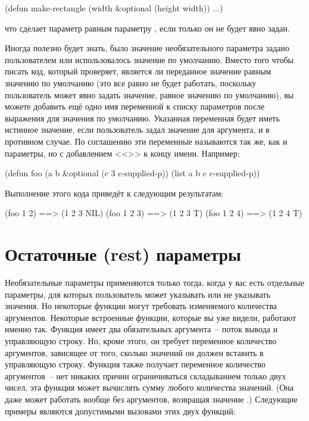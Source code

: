 \begin{myverb}
  (defun make-rectangle (width &optional (height width)) 
    ...)
\end{myverb}

\noindent{}что сделает параметр  равным параметру , если только он не будет
явно задан.

Иногда полезно будет знать, было значение необязательного параметра задано
пользователем или использовалось значение по умолчанию.  Вместо того чтобы писать код,
который проверяет, является ли переданное значение равным значению по умолчанию (это все
равно не будет работать, поскольку пользователь может явно задать значение, равное
значению по умолчанию), вы можете добавить ещё одно имя переменной к списку параметров
после выражения для значения по умолчанию.  Указанная переменная будет иметь истинное
значение, если пользователь задал значение для аргумента, и  в противном случае.
По соглашению эти переменные называются так же, как и параметры, но с добавлением
<<>> к концу имени. Например:

\begin{myverb}
  (defun foo (a b &optional (c 3 c-supplied-p))
    (list a b c c-supplied-p))
\end{myverb}

Выполнение этого кода приведёт к следующим результатам:

\begin{myverb}
  (foo 1 2)   ==> (1 2 3 NIL)
  (foo 1 2 3) ==> (1 2 3 T)
  (foo 1 2 4) ==> (1 2 4 T)
\end{myverb}

\section{Остаточные (rest) параметры}

Необязательные параметры применяются только тогда, когда у вас есть отдельные параметры,
для которых пользователь может указывать или не указывать значения.  Но некоторые функции
могут требовать изменяемого количества аргументов.  Некоторые встроенные функции, которые
вы уже видели, работают именно так.  Функция  имеет два обязательных
аргумента~-- поток вывода и управляющую строку.  Но, кроме этого, он требует переменное
количество аргументов, зависящее от того, сколько значений он должен вставить в
управляющую строку.  Функция \code{+} также получает переменное количество аргументов~--
нет никаких причин ограничиваться складыванием только двух чисел, эта функция может
вычислять сумму любого количества значений. (Она даже может работать вообще без
аргументов, возвращая значение .)  Следующие примеры являются допустимыми вызовами
этих двух функций:

